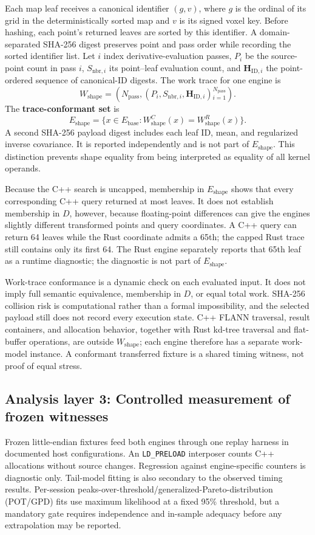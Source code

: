 Each map leaf receives a canonical identifier $(g,v)$, where $g$ is the ordinal of its
grid in the deterministically sorted map and $v$ is its signed voxel key. Before hashing,
each point's returned leaves are sorted by this identifier. A domain-separated SHA-256
digest preserves point and pass order while recording the sorted identifier list. Let $i$
index derivative-evaluation passes, $P_i$ be the source-point count in pass $i$,
$S_{\mathrm{nbr},i}$ its point--leaf evaluation count, and
$\mathbf H_{\mathrm{ID},i}$ the point-ordered sequence of canonical-ID digests. The work
trace for one engine is
\[
 W_{\mathrm{shape}}=
 \left(N_{\mathrm{pass}},
 \left(P_i,S_{\mathrm{nbr},i},\mathbf H_{\mathrm{ID},i}\right){}_
 {i=1}^{N_{\mathrm{pass}}}\right).
\]
The \textbf{trace-conformant set} is
\[
 E_{\mathrm{shape}}=
 \{x\in E_{\mathrm{base}}:
 W_{\mathrm{shape}}^C(x)=W_{\mathrm{shape}}^R(x)\}.
\]
A second SHA-256 payload digest includes each leaf ID, mean, and regularized inverse
covariance. It is reported independently and is not part of $E_{\mathrm{shape}}$.
This distinction prevents shape equality from being interpreted as equality of all
kernel operands.

Because the C++ search is uncapped, membership in $E_{\mathrm{shape}}$ shows that every
corresponding C++ query returned at most \maxnn{} leaves. It does not establish membership
in $D$, however, because floating-point differences can give the engines slightly
different transformed points and query coordinates. A C++ query can return 64 leaves while
the Rust coordinate admits a 65th; the capped Rust trace still contains only its first 64.
The Rust engine separately reports that 65th leaf as a runtime diagnostic; the diagnostic
is not part of $E_{\mathrm{shape}}$.

Work-trace conformance is a dynamic check on each evaluated input. It does not imply full
semantic equivalence, membership in $D$, or equal total work. SHA-256 collision risk is
computational rather than a formal impossibility, and the selected payload still does not
record every execution state. C++ FLANN traversal, result containers, and allocation
behavior, together with Rust kd-tree traversal and flat-buffer operations, are outside
$W_{\mathrm{shape}}$; each engine therefore
has a separate work-model instance. A conformant transferred fixture is a shared timing
witness, not proof of equal stress.

\subsection{Analysis layer 3: Controlled measurement of frozen witnesses}
Frozen little-endian fixtures feed both engines through one replay harness in documented
host configurations. An \texttt{LD\_PRELOAD} interposer counts C++ allocations without
source changes. Regression against engine-specific counters is diagnostic only. Tail-model
fitting is also secondary to the observed timing results. Per-session
peaks-over-threshold/generalized-Pareto-distribution (POT/GPD) fits use maximum likelihood
at a fixed 95\% threshold, but a mandatory gate requires independence and in-sample
adequacy before any extrapolation may be reported.

